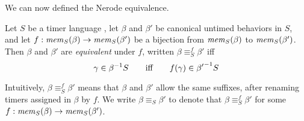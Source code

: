 We can now defined the Nerode equivalence.

\begin{definition}
  \label{def:bj-nerode}
Let $S$ be a timer language ,
let $\beta$ and $\beta'$ be canonical untimed behaviors in $S$, 
and let $f : \getmemorable{S}{\beta} \to \getmemorable{S}{\beta'}$
be a bijection
from $\getmemorable{S}{\beta}$ to $\getmemorable{S}{\beta'}$.
Then $\beta$ and $\beta'$ are \emph{equivalent} under $f$, written
$\beta \equiv_{S}^f \beta'$ iff
\[
\gamma \in \suffixbehs{S}{\beta}
\qquad \mbox{iff} \qquad
f(\gamma) \in \suffixbehs{S}{\beta'}
\]
\end{definition}
Intuitively, $\beta \equiv_{S}^f \beta'$ means that $\beta$ and $\beta'$
allow the same suffixes, after renaming
timers assigned in $\beta$ by $f$.
We write $\beta \equiv_{S} \beta'$ to denote that
$\beta \equiv_{S}^f \beta'$ for some
$f : \getmemorable{S}{\beta} \to \getmemorable{S}{\beta'}$.

